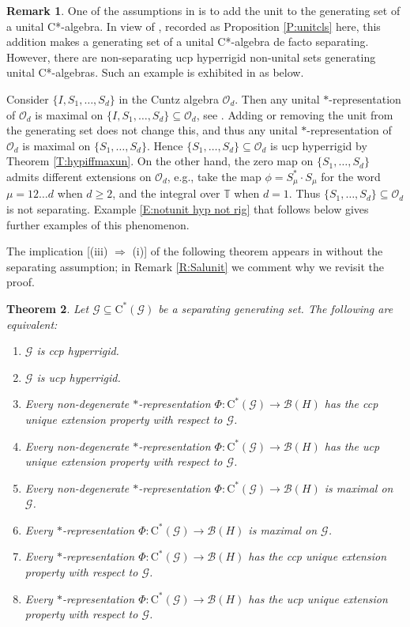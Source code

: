 \documentclass[11pt, draft]{amsart}
\numberwithin{equation}{section}
\theoremstyle{plain}
\newtheorem{theorem}{Theorem}[section]
\theoremstyle{definition}
\newtheorem{remark}[theorem]{Remark}
\theoremstyle{remark}
\newcommand{\B}{{\mathcal{B}}}
\newcommand{\G}{{\mathcal{G}}}
\renewcommand{\O}{{\mathcal{O}}}
\newcommand{\bT}{\mathbb{T}}
\newcommand{\ca}{\mathrm{C}^*}
\begin{document}
\begin{remark} \label{R:Salun}
One of the assumptions in \cite{Sal17} is to add the unit to the generating set of a unital C*-algebra.
In view of \cite[Proposition 3.6]{Sal17}, recorded as Proposition \ref{P:unitcls} here, this addition makes a generating set of a unital C*-algebra de facto separating.
However, there are non-separating ucp hyperrigid non-unital sets generating unital C*-algebras.
Such an example is exhibited in \cite[Example 3.4]{Sal17} as below.

Consider $\{I, S_1, \dots, S_d\}$ in the Cuntz algebra $\O_d$.
Then any unital $*$-representation of $\O_d$ is maximal on $\{I, S_1, \dots, S_d\} \subseteq \O_d$, see \cite{Dun10}.
Adding or removing the unit from the generating set does not change this, and thus any unital $*$-representation of $\O_d$ is maximal on $\{S_1, \dots, S_d\}$.
Hence $\{S_1, \dots, S_d\} \subseteq \O_d$ is ucp hyperrigid by Theorem \ref{T:hypiffmaxun}.
On the other hand, the zero map on  $\{S_1, \dots, S_d\}$ admits different extensions on $\O_d$, e.g., take the map $\phi = S_\mu^* \cdot S_\mu$ for the word $\mu = 1 2 \dots d$ when $d \geq 2$, and the integral over $\bT$ when $d=1$.
Thus $\{S_1, \dots, S_d\} \subseteq \O_d$ is not separating. 
Example \ref{E:notunit hyp not rig} that follows below gives further examples of this phenomenon.
\end{remark}

The implication [(iii) $\Rightarrow$ (i)] of the following theorem appears in \cite[Lemma 2.7, item (ii)]{Sal17} without the separating assumption; in Remark \ref{R:Salunit} we comment why we revisit the proof.

\begin{theorem}\label{T:hypiffuep}
Let $\G \subseteq \ca(\G)$ be a separating generating set.
The following are equivalent:
\begin{enumerate}
\item $\G$ is ccp hyperrigid.
\item $\G$ is ucp hyperrigid.
\item Every non-degenerate $*$-representation $\Phi \colon \ca(\G) \to \B(H)$ has the ccp unique extension property with respect to $\G$.
\item Every non-degenerate $*$-representation $\Phi \colon \ca(\G) \to \B(H)$ has the ucp unique extension property with respect to $\G$.
\item Every non-degenerate $*$-representation $\Phi \colon \ca(\G) \to \B(H)$ is maximal on $\G$.
\item Every $*$-representation $\Phi \colon \ca(\G) \to \B(H)$ is maximal on $\G$.
\item Every $*$-representation $\Phi \colon \ca(\G) \to \B(H)$ has the ccp unique extension property with respect to $\G$.
\item Every $*$-representation $\Phi \colon \ca(\G) \to \B(H)$ has the ucp unique extension property with respect to $\G$.
\end{enumerate}
\end{theorem}
\end{document}

